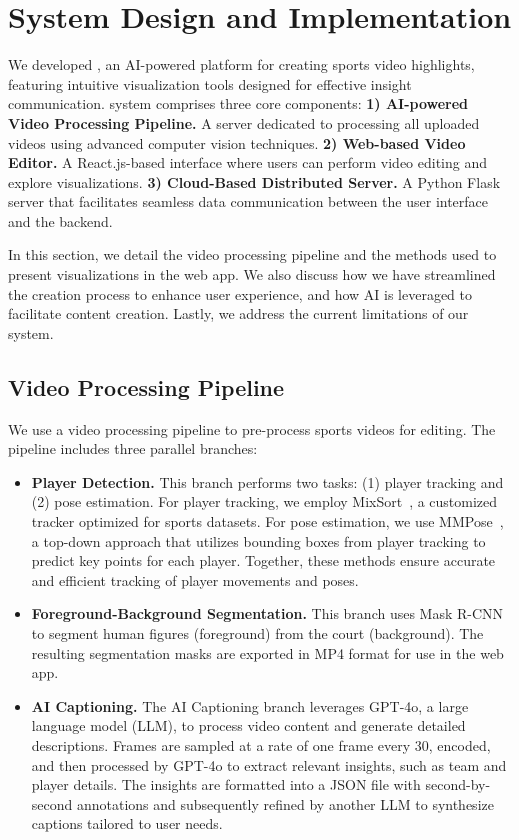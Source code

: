 \section{System Design and Implementation}

We developed \SB{},  an AI-powered platform for creating sports video highlights, featuring intuitive visualization tools designed for effective insight communication.
\SB{} system comprises three core components:
% 
\textbf{1) AI-powered Video Processing Pipeline.} A server dedicated to processing all uploaded videos using advanced computer vision techniques.
\textbf{2) Web-based Video Editor.} A React.js-based interface where users can perform video editing and explore visualizations.
% 
\textbf{3) Cloud-Based Distributed Server.} A Python Flask server that facilitates seamless data communication between the user interface and the backend.

In this section, we detail the video processing pipeline and the methods used to present visualizations in the web app. We also discuss how we have streamlined the creation process to enhance user experience, and how AI is leveraged to facilitate content creation. Lastly, we address the current limitations of our system.

\subsection{Video Processing Pipeline}
\label{sec:video-processing}
We use a video processing pipeline to pre-process sports videos for editing. 
The pipeline includes three parallel branches: 

\begin{itemize}[leftmargin=*, topsep=1pt]
    \item \textbf{Player Detection.}
This branch performs two tasks: (1) player tracking and (2) pose estimation. For player tracking, we employ MixSort~\cite{cui2023sportsmotlargemultiobjecttracking}, a customized tracker optimized for sports datasets. For pose estimation, we use MMPose~\cite{mmpose2020}, a top-down approach that utilizes bounding boxes from player tracking to predict key points for each player. Together, these methods ensure accurate and efficient tracking of player movements and poses.

    \item \textbf{Foreground-Background Segmentation.}
This branch uses Mask R-CNN~\cite{he2018maskrcnn} to segment human figures (foreground) from the court (background). The resulting segmentation masks are exported in MP4 format for use in the web app. 

    \item \textbf{AI Captioning.}
The AI Captioning branch leverages GPT-4o, a large language model (LLM), to process video content and generate detailed descriptions. Frames are sampled at a rate of one frame every 30, encoded, and then processed by GPT-4o to extract relevant insights, such as team and player details. The insights are formatted into a JSON file with second-by-second annotations and subsequently refined by another LLM to synthesize captions tailored to user needs.
\end{itemize}


